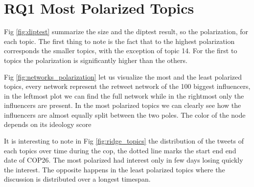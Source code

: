 \section{RQ1 Most Polarized Topics}

Fig \ref{fig:diptest} summarize the size and the diptest result, so the polarization, for each topic. The first thing to note is the fact that to the highest polarization corresponds the smaller topics, with the exception of topic 14. For the first to topics the polarization is significantly higher than the others.

Fig \ref{fig:networks_polarization} let us visualize the most and the least polarized topics, every network represent the retweet network of the 100 biggest influencers, in the leftmost plot we can find the full network while in the rightmost only the influencers are present. In the most polarized topics we can clearly see how the influencers are almost equally split between the two poles. The color of the node depends on its ideology score

It is interesting to note in Fig \ref{fig:ridge_topics} the distribution of the tweets of each topics over time during the cop, the dotted line marks the start end end date of COP26. The most polarized had interest only in few days losing quickly the interest. The opposite happens in the least polarized topics where the discussion is distributed over a longest timespan.  



